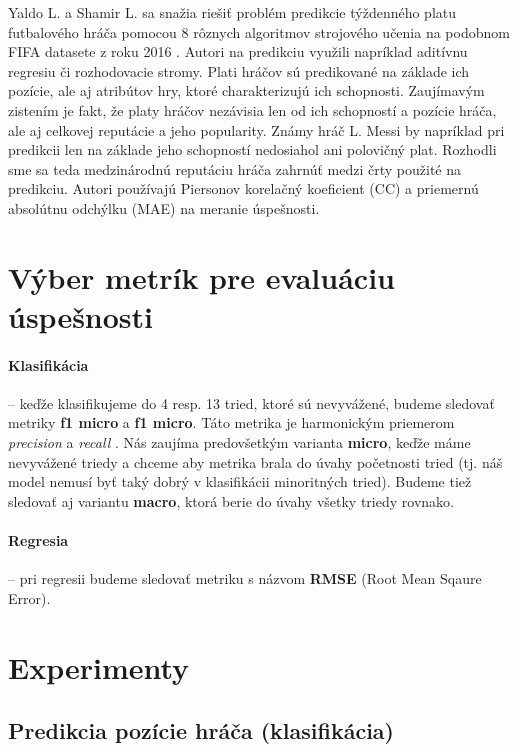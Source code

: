 \documentclass[runningheads]{llncs}
\begin{document}
Yaldo L. a Shamir L. sa snažia riešiť problém predikcie týždenného platu futbalového hráča pomocou 8 rôznych algoritmov strojového učenia na podobnom FIFA datasete z roku 2016 \cite{yaldo2017}. Autori na predikciu využili napríklad aditívnu regresiu či rozhodovacie stromy. Plati hráčov sú predikované na základe ich pozície, ale aj atribútov hry, ktoré charakterizujú ich schopnosti.
Zaujímavým zistením je fakt, že platy hráčov nezávisia len od ich schopností a pozície hráča, ale aj celkovej reputácie a jeho popularity. Známy hráč L. Messi by napríklad pri predikcii len na základe jeho schopností nedosiahol ani polovičný plat. Rozhodli sme sa teda medzinárodnú reputáciu hráča zahrnúť medzi črty použité na predikciu.
Autori používajú Piersonov korelačný koeficient (CC) a priemernú absolútnu odchýlku (MAE) na meranie úspešnosti.


\section{Výber metrík pre evaluáciu úspešnosti}

\paragraph{Klasifikácia} -- keďže klasifikujeme do 4 resp. 13 tried, ktoré sú nevyvážené, budeme sledovať metriky \textbf{f1 micro} a \textbf{f1 micro}.
Táto metrika je harmonickým priemerom \textit{precision} a \textit{recall} \cite{opitz2019macro}.
Nás zaujíma predovšetkým varianta \textbf{micro}, keďže máme nevyvážené triedy a chceme aby metrika brala do úvahy početnosti tried (tj. náš model nemusí byť taký dobrý v klasifikácii minoritných tried). Budeme tiež sledovať aj variantu \textbf{macro}, ktorá berie do úvahy všetky triedy rovnako.

\paragraph{Regresia} -- pri regresii budeme sledovať metriku s názvom \textbf{RMSE} (Root Mean Sqaure Error).

\section{Experimenty}

\subsection{Predikcia pozície hráča (klasifikácia)}
\end{document}
